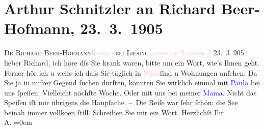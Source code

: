 

               \section[Arthur Schnitzler an Richard Beer-Hofmann, 23. 3. 1905]{ Arthur Schnitzler an Richard Beer-Hofmann,
               23. 3. 1905}\nopagebreak{}\rehead{ }\normalsize\beginnumbering{} \toendnotes[C]{\smallbreak\pagebreak[2]} 
\toendnotes[C]{\smallbreak}\pstart{}{\pb}\textsc{Dr Richard Beer-Hofmann}\pend{}\pstart{}\textsc{\textcolor{pink}{Rodaun}{}\ledrightnote{\textcolor{pink}{Rodaun}}}\pend{}\pstart{}\textsc{bei Liesing}\pend{}\pstart{}\textcolor{pink}{\textsc{Liesinger Straße} 1}{}\ledrightnote{\textcolor{pink}{Liesingerstraße}}\pend{}{\bigskip}\pstart
           \raggedleft{}{\pb}23. 3 905\pend
           \pstart
           lieber Richard, ich höre dſs Sie krank waren, bitte um ein Wort,
               wie’s Ihnen geht. Ferner hör ich u weiſs ich daſs Sie täglich in \textcolor{pink}{Wien}{}\ledrightnote{\textcolor{pink}{Wien}}{ }ſind u Wohnungen anſehen. Da Sie ja in unſrer
               Gegend ſuchen dürften, könnten Sie wirk{\pb}lich einmal
               mit \textcolor{blue}{Paula}{}\ledrightnote{\textcolor{blue}{Paula Beer-Hofmann}} bei uns ſpeiſen. Vielleicht nächſte
               Woche. Oder mit uns bei meiner \textcolor{blue}{Mama}{}. Nicht das Speiſen iſt mir übrigens die Haupſache.\pend
           \pstart
           – Die Reiſe war ſehr ſchön; die See beinah immer vollko{\geminationm}en ſtill.\pend
           \pstart
           {\pb}Schreiben Sie mir ein Wort.\pend
           \pstart
           Herzlichſt Ihr{\\[\baselineskip]}\spacefill\mbox{A.}\pend
           \leftskip=0em{}\endnumbering{}  
      